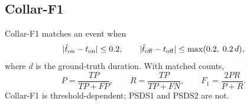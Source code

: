 \subsection{Collar-F1}
Collar-F1 matches an event when
\begin{equation}
|\hat t_{\mathrm{on}}-t_{\mathrm{on}}|\le 0.2,
\qquad
|\hat t_{\mathrm{off}}-t_{\mathrm{off}}|\le \max(0.2,\;0.2\,d),
\end{equation}
where $d$ is the ground-truth duration. With matched counts,
\begin{equation}
P=\frac{TP}{TP+FP},
\qquad
R=\frac{TP}{TP+FN},
\qquad
F_1=\frac{2PR}{P+R}.
\end{equation}
Collar-F1 is threshold-dependent; PSDS1 and PSDS2 are not.
